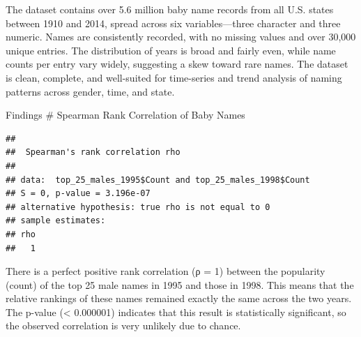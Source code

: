 \documentclass[11pt,preprint]{elsarticle}
\numberwithin{equation}{section}
\numberwithin{figure}{section}
\numberwithin{table}{section}
\begin{document}
The dataset contains over 5.6 million baby name records from all U.S.
states between 1910 and 2014, spread across six variables---three
character and three numeric. Names are consistently recorded, with no
missing values and over 30,000 unique entries. The distribution of years
is broad and fairly even, while name counts per entry vary widely,
suggesting a skew toward rare names. The dataset is clean, complete, and
well-suited for time-series and trend analysis of naming patterns across
gender, time, and state.

\newpage

Findings \# Spearman Rank Correlation of Baby Names

\begin{verbatim}
## 
##  Spearman's rank correlation rho
## 
## data:  top_25_males_1995$Count and top_25_males_1998$Count
## S = 0, p-value = 3.196e-07
## alternative hypothesis: true rho is not equal to 0
## sample estimates:
## rho 
##   1
\end{verbatim}

There is a perfect positive rank correlation (ρ = 1) between the
popularity (count) of the top 25 male names in 1995 and those in 1998.
This means that the relative rankings of these names remained exactly
the same across the two years. The p-value (\textless{} 0.000001)
indicates that this result is statistically significant, so the observed
correlation is very unlikely due to chance.
\end{document}
